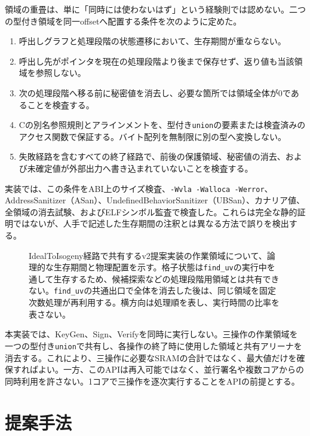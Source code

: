 \documentclass[a4paper,10pt]{ltjsarticle}
\theoremstyle{definition}
\theoremstyle{remark}
\begin{document}
領域の重畳は、単に「同時には使わないはず」という経験則では認めない。二つの型付き領域を同一offsetへ配置する条件を次のように定めた。

\begin{enumerate}[leftmargin=2.2em]
  \item 呼出しグラフと処理段階の状態遷移において、生存期間が重ならない。
  \item 呼出し先がポインタを現在の処理段階より後まで保存せず、返り値も当該領域を参照しない。
  \item 次の処理段階へ移る前に秘密値を消去し、必要な箇所では領域全体が0であることを検査する。
  \item Cの別名参照規則とアラインメントを、型付き\texttt{union}の要素または検査済みのアクセス関数で保証する。バイト配列を無制限に別の型へ変換しない。
  \item 失敗経路を含むすべての終了経路で、前後の保護領域、秘密値の消去、および未確定値が外部出力へ書き込まれていないことを検査する。
\end{enumerate}

実装では、この条件をABI上のサイズ検査、\texttt{-Wvla -Walloca -Werror}、AddressSanitizer（ASan）、UndefinedBehaviorSanitizer（UBSan）、カナリア値、全領域の消去試験、およびELFシンボル監査で検査した。これらは完全な静的証明ではないが、人手で記述した生存期間の注釈とは異なる方法で誤りを検出する。

\begin{figure}[H]
  \centering
  
  \caption{IdealToIsogeny経路で共有するv2提案実装の作業領域について、論理的な生存期間と物理配置を示す。格子状態は\texttt{find\_uv}の実行中を通して生存するため、候補探索などの処理段階用領域とは共有できない。\texttt{find\_uv}の共通出口で全体を消去した後は、同じ領域を固定次数処理が再利用する。横方向は処理順を表し、実行時間の比率を表さない。}
  \label{fig:lifetime}
\end{figure}

本実装では、KeyGen、Sign、Verifyを同時に実行しない。三操作の作業領域を一つの型付き\texttt{union}で共有し、各操作の終了時に使用した領域と共有アリーナを消去する。これにより、三操作に必要なSRAMの合計ではなく、最大値だけを確保すればよい。一方、このAPIは再入可能ではなく、並行署名や複数コアからの同時利用を許さない。1コアで三操作を逐次実行することをAPIの前提とする。

\section{提案手法}
\label{sec:method}
\end{document}
